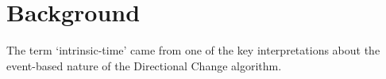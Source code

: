 \chapter{Background}

The term `intrinsic-time' came from one of the key interpretations about the event-based nature of the Directional Change algorithm.
